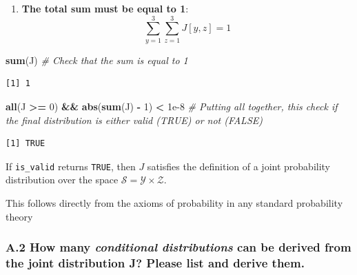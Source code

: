 \documentclass[
]{article}
\newenvironment{Shaded}{\begin{snugshade}}{\end{snugshade}}
\newcommand{\CommentTok}[1]{\textcolor[rgb]{0.56,0.35,0.01}{\textit{#1}}}
\newcommand{\DecValTok}[1]{\textcolor[rgb]{0.00,0.00,0.81}{#1}}
\newcommand{\FloatTok}[1]{\textcolor[rgb]{0.00,0.00,0.81}{#1}}
\newcommand{\FunctionTok}[1]{\textcolor[rgb]{0.13,0.29,0.53}{\textbf{#1}}}
\newcommand{\NormalTok}[1]{#1}
\newcommand{\SpecialCharTok}[1]{\textcolor[rgb]{0.81,0.36,0.00}{\textbf{#1}}}
\providecommand{\tightlist}{%
  \setlength{\itemsep}{0pt}\setlength{\parskip}{0pt}}
\begin{document}
\begin{enumerate}
\def\labelenumi{\arabic{enumi}.}
\setcounter{enumi}{1}
\tightlist
\item
  \textbf{The total sum must be equal to 1}: \[
  \sum_{y=1}^{3} \sum_{z=1}^{3} J[y, z] = 1
  \]
\end{enumerate}

\begin{Shaded}
\begin{Highlighting}[]
\FunctionTok{sum}\NormalTok{(J) }\CommentTok{\# Check that the sum is equal to 1}
\end{Highlighting}
\end{Shaded}

\begin{verbatim}
[1] 1
\end{verbatim}

\begin{Shaded}
\begin{Highlighting}[]
\FunctionTok{all}\NormalTok{(J }\SpecialCharTok{\textgreater{}=} \DecValTok{0}\NormalTok{) }\SpecialCharTok{\&\&} \FunctionTok{abs}\NormalTok{(}\FunctionTok{sum}\NormalTok{(J) }\SpecialCharTok{{-}} \DecValTok{1}\NormalTok{) }\SpecialCharTok{\textless{}} \FloatTok{1e{-}8} \CommentTok{\# Putting all together, this check if the final distribution is either valid (TRUE) or not (FALSE)}
\end{Highlighting}
\end{Shaded}

\begin{verbatim}
[1] TRUE
\end{verbatim}

If \texttt{is\_valid} returns \texttt{TRUE}, then \(J\) satisfies the
definition of a joint probability distribution over the space
\(\mathcal{S} = \mathcal{Y} \times \mathcal{Z}\).

This follows directly from the axioms of probability in any standard
probability theory

\bigskip

\subsubsection{\texorpdfstring{A.2 How many \emph{conditional
distributions} can be derived from the joint distribution J? Please list
and derive
them.}{A.2 How many conditional distributions can be derived from the joint distribution J? Please list and derive them.}}\label{a.2-how-many-conditional-distributions-can-be-derived-from-the-joint-distribution-j-please-list-and-derive-them.}
\end{document}

